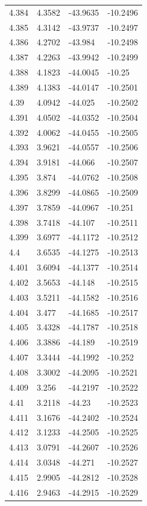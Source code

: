 \begin{tabular}{llll}
4.384 & 4.3582 & -43.9635 & -10.2496 \\
4.385 & 4.3142 & -43.9737 & -10.2497 \\
4.386 & 4.2702 & -43.984 & -10.2498 \\
4.387 & 4.2263 & -43.9942 & -10.2499 \\
4.388 & 4.1823 & -44.0045 & -10.25 \\
4.389 & 4.1383 & -44.0147 & -10.2501 \\
4.39 & 4.0942 & -44.025 & -10.2502 \\
4.391 & 4.0502 & -44.0352 & -10.2504 \\
4.392 & 4.0062 & -44.0455 & -10.2505 \\
4.393 & 3.9621 & -44.0557 & -10.2506 \\
4.394 & 3.9181 & -44.066 & -10.2507 \\
4.395 & 3.874 & -44.0762 & -10.2508 \\
4.396 & 3.8299 & -44.0865 & -10.2509 \\
4.397 & 3.7859 & -44.0967 & -10.251 \\
4.398 & 3.7418 & -44.107 & -10.2511 \\
4.399 & 3.6977 & -44.1172 & -10.2512 \\
4.4 & 3.6535 & -44.1275 & -10.2513 \\
4.401 & 3.6094 & -44.1377 & -10.2514 \\
4.402 & 3.5653 & -44.148 & -10.2515 \\
4.403 & 3.5211 & -44.1582 & -10.2516 \\
4.404 & 3.477 & -44.1685 & -10.2517 \\
4.405 & 3.4328 & -44.1787 & -10.2518 \\
4.406 & 3.3886 & -44.189 & -10.2519 \\
4.407 & 3.3444 & -44.1992 & -10.252 \\
4.408 & 3.3002 & -44.2095 & -10.2521 \\
4.409 & 3.256 & -44.2197 & -10.2522 \\
4.41 & 3.2118 & -44.23 & -10.2523 \\
4.411 & 3.1676 & -44.2402 & -10.2524 \\
4.412 & 3.1233 & -44.2505 & -10.2525 \\
4.413 & 3.0791 & -44.2607 & -10.2526 \\
4.414 & 3.0348 & -44.271 & -10.2527 \\
4.415 & 2.9905 & -44.2812 & -10.2528 \\
4.416 & 2.9463 & -44.2915 & -10.2529 \\

\end{tabular}
